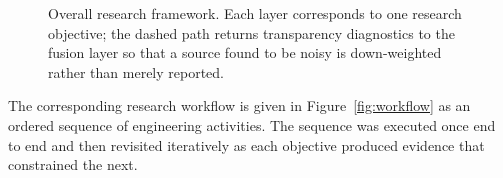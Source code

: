 \begin{figure}[!htb]
{}
\caption[Overall research framework]{Overall research framework. Each layer corresponds to one research objective;
the dashed path returns transparency diagnostics to the fusion layer so that a source
found to be noisy is down-weighted rather than merely reported.}
\label{fig:frame}
\end{figure}

The corresponding research workflow is given in Figure~\ref{fig:workflow} as an ordered
sequence of engineering activities. The sequence was executed once end to end and then
revisited iteratively as each objective produced evidence that constrained the next.

